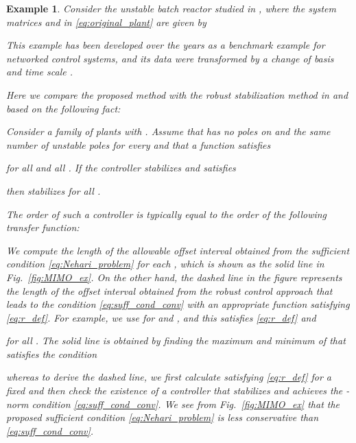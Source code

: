 \documentclass[letterpaper, 12pt, draftcls, onecolumn]{ieeeconf}
\newtheorem{example}[theorem]{Example}
\begin{document}
\begin{example}
Consider the unstable batch reactor studied 
in \cite{Rosenbrock1972}, where
the system matrices  and  in \eqref{eq:original_plant}
are given by

This example has been developed over the years as a benchmark example for networked
control systems, and
its data were transformed by a change of basis
and time scale \cite{Rosenbrock1972}.

Here we compare the proposed method with the robust stabilization method in
\cite{doyle1981} and \cite[Chap.~7]{vidyasagar1985} based on
the following fact: {\em
	Consider a family of plants  with .
	Assume 
	that 
	 has no poles on  and the same number of unstable poles for every 
	and
	that a function  satisfies
	 
	for all 
	and all .
	If the controller  
	stabilizes  and
	satisfies 
	
	then  stabilizes  for all .}
The order of such a controller is typically equal to
the order of the following transfer function:


We compute the length of the allowable offset interval 
obtained from the sufficient condition \eqref{eq:Nehari_problem} for each ,
which is shown as the solid line in Fig.~\ref{fig:MIMO_ex}.
On the other hand, the dashed line in the figure represents 
the length of the offset interval 
obtained from the robust control approach that leads to the condition
\eqref{eq:suff_cond_conv} with an appropriate function 
satisfying \eqref{eq:r_def}.
For example, we use  for  and , and this  satisfies \eqref{eq:r_def} and

for all .
The solid line is obtained by finding the maximum and minimum of
 that satisfies
the condition

whereas to derive the dashed line, we first calculate  satisfying
\eqref{eq:r_def} for a fixed  and
then check the existence of a controller  that stabilizes  and achieves the
-norm condition \eqref{eq:suff_cond_conv}.
We see from Fig.~\ref{fig:MIMO_ex}
that the proposed sufficient condition \eqref{eq:Nehari_problem} 
is less conservative
than \eqref{eq:suff_cond_conv}.


\end{example}
\end{document}
